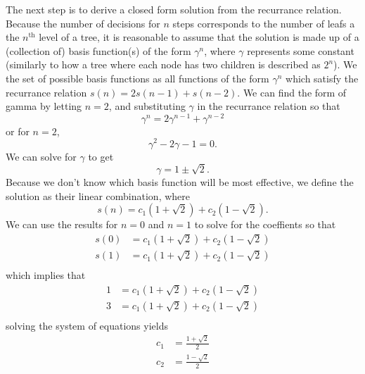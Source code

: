 \documentclass{article}
\begin{document}
The next step is to derive a closed form solution from the recurrance relation. Because the number of decisions for $n$ steps corresponds to the number of leafs a the $n^{\text{th}}$ level of a tree, it is reasonable to assume that the solution is made up of a (collection of) basis function(s) of the form $\gamma^n$, where $\gamma$ represents some constant (similarly to how a tree where each node has two children is described as $2^n$). We the set of possible basis functions as all functions of the form $\gamma^n$ which satisfy the recurrance relation $s(n) = 2s(n - 1) + s(n - 2)$.  We can find the form of gamma by letting $n = 2$, and substituting $\gamma$ in the recurrance relation so that
\begin{equation*}
	\gamma^n = 2\gamma^{n-1} + \gamma^{n - 2}
\end{equation*}
or for $n = 2$, 
\begin{equation*}
	\gamma^2 - 2\gamma - 1 = 0.
\end{equation*}
We can solve for $\gamma$ to get
\begin{equation*}
	\gamma = 1 \pm \sqrt{2}.
\end{equation*}
Because we don't know which basis function will be most effective, we define the solution as their linear combination, where
\begin{equation*}
	s(n) = c_1(1 + \sqrt{2}) + c_2(1 - \sqrt{2}).
\end{equation*}
We can use the results for $n = 0$ and $n = 1$ to solve for the coeffients so that
\begin{equation*}\begin{aligned}
	s(0) &= c_1(1 + \sqrt{2}) + c_2(1 - \sqrt{2}) \\
	s(1) &= c_1(1 + \sqrt{2}) + c_2(1 - \sqrt{2}) \\
\end{aligned}\end{equation*}
which implies that
\begin{equation*}\begin{aligned}
	1 &= c_1(1 + \sqrt{2}) + c_2(1 - \sqrt{2}) \\
	3 &= c_1(1 + \sqrt{2}) + c_2(1 - \sqrt{2}) \\
\end{aligned}\end{equation*}
solving the system of equations yields
\begin{equation*}\begin{aligned}
	c_1 &= \frac{1 + \sqrt{2}}{2} \\
	c_2 &= \frac{1 - \sqrt{2}}{2} \\
\end{aligned}\end{equation*}
\end{document}
